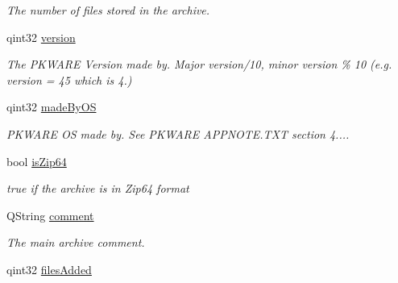 \begin{DoxyCompactItemize}
\begin{DoxyCompactList}\small\item\em The number of files stored in the archive. \end{DoxyCompactList}\item 
qint32 \hyperlink{class_zip_info_acc69c3587d671e426caa006188d15aef}{version}\hypertarget{class_zip_info_acc69c3587d671e426caa006188d15aef}{}\label{class_zip_info_acc69c3587d671e426caa006188d15aef}

\begin{DoxyCompactList}\small\item\em The P\+K\+W\+A\+RE Version made by. Major version/10, minor version \% 10 (e.\+g. version = 45 which is 4.) \end{DoxyCompactList}\item 
qint32 \hyperlink{class_zip_info_a246e916a26f7b6faaa1b1351843b65f4}{made\+By\+OS}\hypertarget{class_zip_info_a246e916a26f7b6faaa1b1351843b65f4}{}\label{class_zip_info_a246e916a26f7b6faaa1b1351843b65f4}

\begin{DoxyCompactList}\small\item\em P\+K\+W\+A\+RE OS made by. See P\+K\+W\+A\+RE A\+P\+P\+N\+O\+T\+E.\+T\+XT section 4.... \end{DoxyCompactList}\item 
bool \hyperlink{class_zip_info_aeaf8ebb8b70b809b3c7e01e883013aaf}{is\+Zip64}\hypertarget{class_zip_info_aeaf8ebb8b70b809b3c7e01e883013aaf}{}\label{class_zip_info_aeaf8ebb8b70b809b3c7e01e883013aaf}

\begin{DoxyCompactList}\small\item\em true if the archive is in Zip64 format \end{DoxyCompactList}\item 
Q\+String \hyperlink{class_zip_info_afa4a53c3fb9c9ca0b27dd6ba3f6f96ec}{comment}\hypertarget{class_zip_info_afa4a53c3fb9c9ca0b27dd6ba3f6f96ec}{}\label{class_zip_info_afa4a53c3fb9c9ca0b27dd6ba3f6f96ec}

\begin{DoxyCompactList}\small\item\em The main archive comment. \end{DoxyCompactList}\item 
qint32 \hyperlink{class_zip_info_a1e848d0b51f1feda0975507121d88e3d}{files\+Added}\hypertarget{class_zip_info_a1e848d0b51f1feda0975507121d88e3d}{}\label{class_zip_info_a1e848d0b51f1feda0975507121d88e3d}


\end{DoxyCompactItemize}
